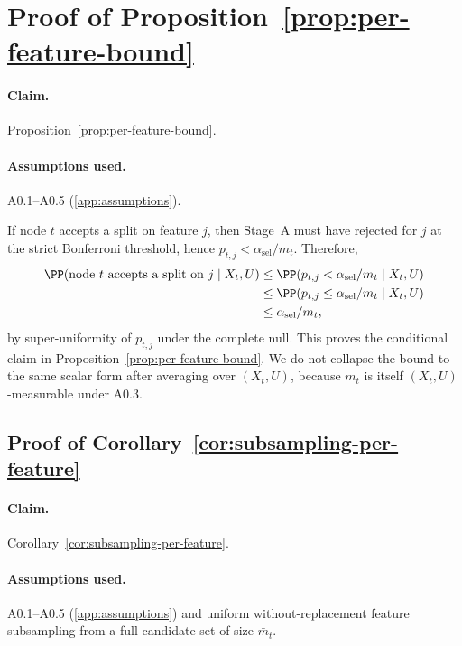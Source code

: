 \section{Proof of Proposition~\ref{prop:per-feature-bound}}
\label{app:proof-per-feature}

\paragraph{Claim.} Proposition~\ref{prop:per-feature-bound}.
\paragraph{Assumptions used.} A0.1--A0.5 (\cref{app:assumptions}).

If node $t$ accepts a split on feature $j$, then Stage~A must have rejected for
$j$ at the strict Bonferroni threshold, hence
$p_{t,j} < \alpha_{\mathrm{sel}}/m_t$. Therefore,
%
\begin{equation}
  \begin{aligned}
    \PP(\text{node $t$ accepts a split on $j$} \mid X_t,U)
    &\le \PP(p_{t,j} < \alpha_{\mathrm{sel}}/m_t \mid X_t,U) \\
    &\le \PP(p_{t,j} \le \alpha_{\mathrm{sel}}/m_t \mid X_t,U) \\
    &\le \alpha_{\mathrm{sel}}/m_t,
  \end{aligned}
\end{equation}
%
by super-uniformity of $p_{t,j}$ under the complete null. This proves the
conditional claim in Proposition~\ref{prop:per-feature-bound}. We do not collapse
the bound to the same scalar form after averaging over $(X_t,U)$, because
$m_t$ is itself $(X_t,U)$-measurable under A0.3.

\subsection{Proof of Corollary~\ref{cor:subsampling-per-feature}}
\label{app:proof-subsampling-per-feature}

\paragraph{Claim.} Corollary~\ref{cor:subsampling-per-feature}.
\paragraph{Assumptions used.} A0.1--A0.5 (\cref{app:assumptions}) and uniform
without-replacement feature subsampling from a full candidate set of size $\bar m_t$.

